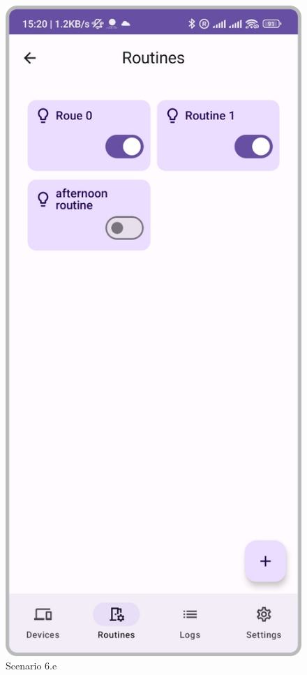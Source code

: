 \begin{enumerate}
\begin{enumerate}
    \begin{figure}
        \centering
        \includegraphics[width=0.5\linewidth]{imgs/usercase/scenario6-c.png}
        \caption{Scenario 6.e}
        \label{fig:enter-label}
    \end{figure}
    \end{enumerate}
\end{enumerate}